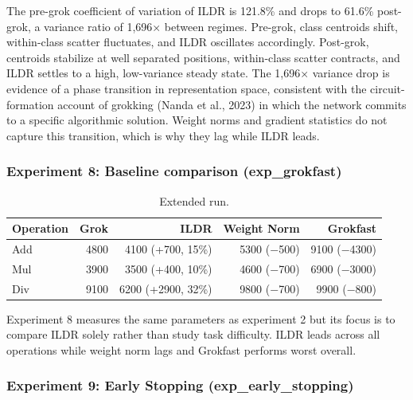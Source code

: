 \documentclass{article}
\begin{document}
The pre-grok coefficient of variation of ILDR is 121.8\% and drops to 61.6\% post-grok, a variance ratio of 1,696× between regimes. Pre-grok, class centroids shift, within-class scatter fluctuates, and ILDR oscillates accordingly. Post-grok, centroids stabilize at well separated positions, within-class scatter contracts, and ILDR settles to a high, low-variance steady state. The 1,696× variance drop is evidence of a phase transition in representation space, consistent with the circuit-formation account of grokking (Nanda et al., 2023) in which the network commits to a specific algorithmic solution. Weight norms and gradient statistics do not capture this transition, which is why they lag while ILDR leads.



\subsubsection{Experiment 8: Baseline comparison (exp\_grokfast)}

\begin{table}[H]
\centering
\begin{tabular}{lrrrr}
\hline
Operation & Grok & ILDR & Weight Norm & Grokfast \\
\hline
Add & 4800 & 4100 (+700, 15\%)  & 5300 ($-$500) & 9100 ($-$4300) \\
Mul & 3900 & 3500 (+400, 10\%)  & 4600 ($-$700) & 6900 ($-$3000) \\
Div & 9100 & 6200 (+2900, 32\%) & 9800 ($-$700) & 9900 ($-$800)  \\
\hline
\end{tabular}
\caption{Extended run.}
\label{tab:grokfast_ops}
\end{table}

Experiment 8 measures the same parameters as experiment 2 but its focus is to compare ILDR solely rather than study task difficulty. ILDR leads across all operations while weight norm lags and Grokfast performs worst overall. 


\subsubsection{Experiment 9: Early Stopping (exp\_early\_stopping)}
\end{document}
